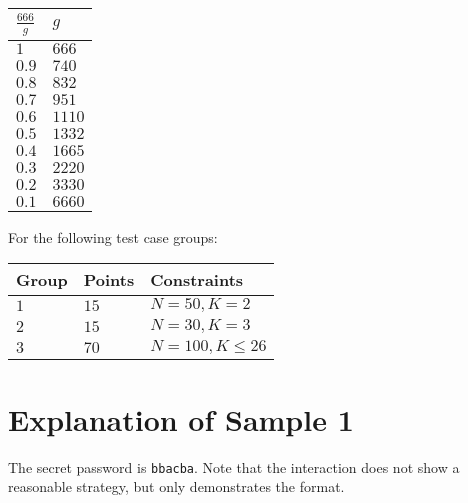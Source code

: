 \begin{center}
  \noindent
  \begin{tabular}{| l | l |}
    \hline
    $\frac{666}{g}$ & $g$ \\ \hline
    $1$             & $666$ \\ \hline
    $0.9$           & $740$ \\ \hline
    $0.8$           & $832$ \\ \hline
    $0.7$           & $951$ \\ \hline
    $0.6$           & $1110$ \\ \hline
    $0.5$           & $1332$ \\ \hline
    $0.4$           & $1665$ \\ \hline
    $0.3$           & $2220$ \\ \hline
    $0.2$           & $3330$ \\ \hline
    $0.1$           & $6660$ \\ \hline
  \end{tabular}
\end{center}
  
For the following test case groups:

\noindent
\begin{tabular}{| l | l | p{12cm} |}
  \hline
  \textbf{Group} & \textbf{Points} & \textbf{Constraints} \\ \hline
  $1$    & $15$       & $N = 50, K = 2$ \\ \hline
  $2$    & $15$       & $N = 30, K = 3$ \\ \hline
  $3$    & $70$       & $N = 100, K \leq 26$ \\ \hline
\end{tabular}

\section*{Explanation of Sample 1}
The secret password is \texttt{bbacba}. Note that the interaction does not show a reasonable strategy,
but only demonstrates the format.